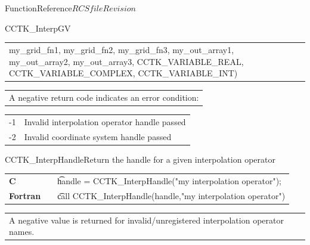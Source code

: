 \begin{cactuspart}{FunctionReference}{$RCSfile$}{$Revision$}
\begin{CCTKFunc}{CCTK\_InterpGV}
\begin{examples}
\begin{tabular}{@{}p{3cm}cp{11cm}}
{\hspace{2ex} my\_grid\_fn1,  my\_grid\_fn2, my\_grid\_fn3,\vfill
\hspace{2ex} my\_out\_array1, my\_out\_array2, my\_out\_array3,\vfill
\hspace{2ex} CCTK\_VARIABLE\_REAL, CCTK\_VARIABLE\_COMPLEX, CCTK\_VARIABLE\_INT)
}
\\
\end{tabular}
\end{examples}
\begin{errorcodes}
\begin{tabular}{l}
A negative return code indicates an error condition:
\end{tabular}
\begin{tabular}{ll}
-1 & Invalid interpolation operator handle passed\\
-2 & Invalid coordinate system handle passed\\
\end{tabular}
\end{errorcodes}
\end{CCTKFunc}


\begin{CCTKFunc}{CCTK\_InterpHandle}{Return the handle for a given interpolation operator}
\label{CCTK-InterpHandle}
\showargs
\begin{params}
\end{params}
\begin{discussion}
\end{discussion}
\begin{examples}
\begin{tabular}{@{}p{3cm}cp{11cm}}
\hfill {\bf C} && {\t handle =  CCTK\_InterpHandle("my interpolation operator");}
\\
\hfill {\bf Fortran} && {\t call CCTK\_InterpHandle(handle,"my interpolation operator")}
\\
\end{tabular}
\end{examples}
\begin{errorcodes}
\begin{tabular}{l}
A negative value is returned for invalid/unregistered interpolation operator names.
\end{tabular}
\end{errorcodes}
\end{CCTKFunc}


\end{cactuspart}
